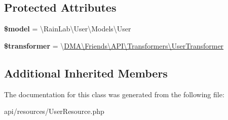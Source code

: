 \subsection*{Protected Attributes}
\begin{DoxyCompactItemize}
\item 
\hypertarget{classDMA_1_1Friends_1_1API_1_1Resources_1_1UserResource_a0ee667d96cfd9f413926262617d5137a}{}{\bfseries \$model} = \textquotesingle{}\textbackslash{}Rain\+Lab\textbackslash{}\+User\textbackslash{}\+Models\textbackslash{}\+User\textquotesingle{}\label{classDMA_1_1Friends_1_1API_1_1Resources_1_1UserResource_a0ee667d96cfd9f413926262617d5137a}

\item 
\hypertarget{classDMA_1_1Friends_1_1API_1_1Resources_1_1UserResource_a8c605a656148290ab8753ac018e28d7b}{}{\bfseries \$transformer} = \textquotesingle{}\textbackslash{}\hyperlink{classDMA_1_1Friends_1_1API_1_1Transformers_1_1UserTransformer}{D\+M\+A\textbackslash{}\+Friends\textbackslash{}\+A\+P\+I\textbackslash{}\+Transformers\textbackslash{}\+User\+Transformer}\textquotesingle{}\label{classDMA_1_1Friends_1_1API_1_1Resources_1_1UserResource_a8c605a656148290ab8753ac018e28d7b}

\end{DoxyCompactItemize}
\subsection*{Additional Inherited Members}


The documentation for this class was generated from the following file\+:\begin{DoxyCompactItemize}
\item 
api/resources/User\+Resource.\+php\end{DoxyCompactItemize}
